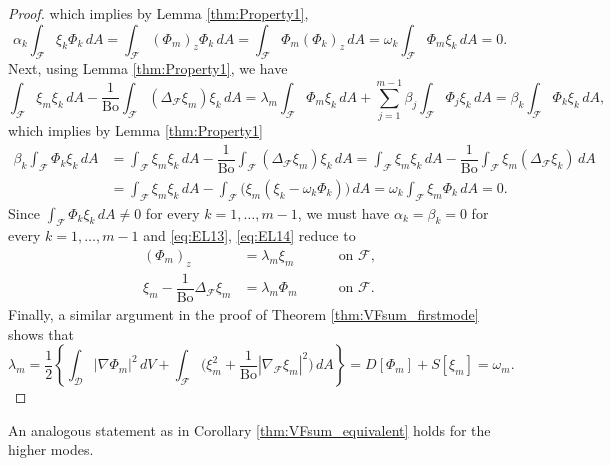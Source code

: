 \documentclass[letterpaper, 12pt]{amsart}
\newcommand{\bond}{\mathrm{Bo}}
\newcommand{\D}{\mathcal{D}}
\newcommand{\F}{\mathcal{F}}
\begin{document}
\begin{proof}
which implies by Lemma  \ref{thm:Property1},
\[ \alpha_k\int_\F \xi_k\Phi_k\, dA = \int_\F (\Phi_m)_z\Phi_k\, dA= \int_\F \Phi_m(\Phi_k)_z\, dA  = \omega_k\int_\F \Phi_m\xi_k\, dA = 0.\]
Next, using Lemma \ref{thm:Property1}, we have
\[\int_\F \xi_m\xi_k\, dA - \dfrac{1}{\bond}\int_\F (\Delta_\F\xi_m)\xi_k\, dA  = \lambda_m {\int_\F\Phi_m\xi_k\, dA} + \sum_{j=1}^{m-1} \beta_j\int_\F\Phi_j\xi_k\, dA = \beta_k\int_\F \Phi_k\xi_k\, dA,\]
which implies by Lemma \ref{thm:Property1}
\[ \begin{split}\beta_k \int_\F\Phi_k\xi_k\, dA & = \int_\F\xi_m\xi_k\, dA - \dfrac{1}{\bond}\int_\F (\Delta_\F\xi_m)\xi_k\, dA = \int_\F\xi_m\xi_k\, dA - \dfrac{1}{\bond}\int_\F \xi_m(\Delta_\F\xi_k)\, dA \\
& = \int_\F\xi_m\xi_k\, dA - \int_\F \Big(\xi_m(\xi_k - \omega_k\Phi_k)\Big)\, dA= \omega_k\int_\F \xi_m\Phi_k\, dA = 0.\end{split}
\]
Since $\displaystyle\int_\F\Phi_k\xi_k\, dA\neq 0$ for every $k=1,\ldots,m-1$, we must have $\alpha_k=\beta_k=0$ for every $k=1,\ldots,m-1$ and \eqref{eq:EL13}, \eqref{eq:EL14} reduce to
\begin{subequations}
\begin{alignat}{3}
(\Phi_m)_z & = \lambda_m\xi_m && \quad\text{ on }\F, \label{eq:EL13a} \\
\xi_m - \dfrac{1}{\bond}\Delta_\F\xi_m & = \lambda_m\Phi_m && \quad\text{ on }\F.  \label{eq:EL14a}
\end{alignat}
\end{subequations}
Finally, a similar argument in the proof of Theorem \ref{thm:VFsum_firstmode} shows that 
\[ \lambda_m = \dfrac{1}{2}\left\{\int_\D |\nabla\Phi_m|^2\, dV + \int_\F \Big(\xi_m^2 + \dfrac{1}{\bond}|\nabla_\F\xi_m|^2\Big)\, dA\right\} = D[\Phi_m] + S[\xi_m] = \omega_m. \]
\end{proof}
An analogous statement as in Corollary \ref{thm:VFsum_equivalent} holds for the higher modes. 
\end{document}
